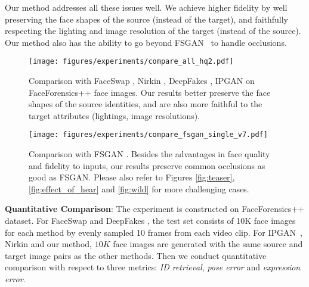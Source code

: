 Our method addresses all these issues well. We achieve higher fidelity by well preserving the face shapes of the source (instead of the target), and faithfully respecting the lighting and image resolution of the target (instead of the source). Our method also has the ability to go beyond FSGAN~\cite{nirkin2019fsgan} to handle occlusions.

\begin{figure}[t]
\centering
 \texttt{[image: figures/experiments/compare\_all\_hq2.pdf]}
 \footnotesize
 \caption{Comparison with FaceSwap \cite{faceswap}, Nirkin \etal \cite{nirkin2018face}, DeepFakes \cite{deepfake}, IPGAN \cite{Bao_ipgan} on FaceForensics++ \cite{rossler2019faceforensics++} face images. Our results better preserve the face shapes of the source identities, and are also more faithful to the target attributes (\eg lightings, image resolutions).}
\label{fig:compare_all_no_fsgan}
\vspace{-1em}
\end{figure}

\begin{figure}[t]
\centering
 \texttt{[image: figures/experiments/compare\_fsgan\_single\_v7.pdf]}
 \footnotesize
 \caption{Comparison with FSGAN \cite{nirkin2019fsgan}. 
Besides the advantages in face quality and fidelity to inputs, our results preserve common occlusions as good as FSGAN. 
Please also refer to Figures \ref{fig:teaser}, \ref{fig:effect_of_hear} and \ref{fig:wild} for more challenging cases.}
\label{fig:compare_fsgan}
\vspace{-1em}
\end{figure}

\noindent\textbf{Quantitative Comparison}:
The experiment is constructed on FaceForensics++ \cite{rossler2019faceforensics++} dataset. For FaceSwap \cite{faceswap} and DeepFakes \cite{deepfake}, the test set consists of 10K face images for each method by evenly sampled 10 frames from each video clip. For IPGAN~\cite{Bao_ipgan}, Nirkin \etal \cite{nirkin2018face} and our method, $10K$ face images are generated with the same source and target image pairs as the other methods.
Then we conduct quantitative comparison with respect to three metrics: \emph{ID retrieval}, \emph{pose error} and \emph{expression error}.

